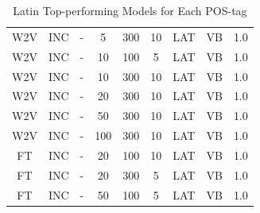 \begin{table}[h]
\begin{tabular}{ccccccccc}
W2V             & INC              & -                     & 5                 & 300             & 10                        & LAT           & VB             & 1.0             \\
W2V             & INC              & -                     & 10                & 100             & 5                         & LAT           & VB             & 1.0             \\
W2V             & INC              & -                     & 10                & 300             & 10                        & LAT           & VB             & 1.0             \\
W2V             & INC              & -                     & 20                & 300             & 10                        & LAT           & VB             & 1.0             \\
W2V             & INC              & -                     & 50                & 300             & 10                        & LAT           & VB             & 1.0             \\
W2V             & INC              & -                     & 100               & 300             & 10                        & LAT           & VB             & 1.0             \\
FT              & INC              & -                     & 20                & 100             & 10                        & LAT           & VB             & 1.0             \\
FT              & INC              & -                     & 20                & 300             & 5                         & LAT           & VB             & 1.0             \\
FT              & INC              & -                     & 50                & 100             & 5                         & LAT           & VB             & 1.0             \\
\bottomrule
\end{tabular}
\caption{Latin Top-performing Models for Each POS-tag}
\label{tab:lat-posresults}
\end{table}

